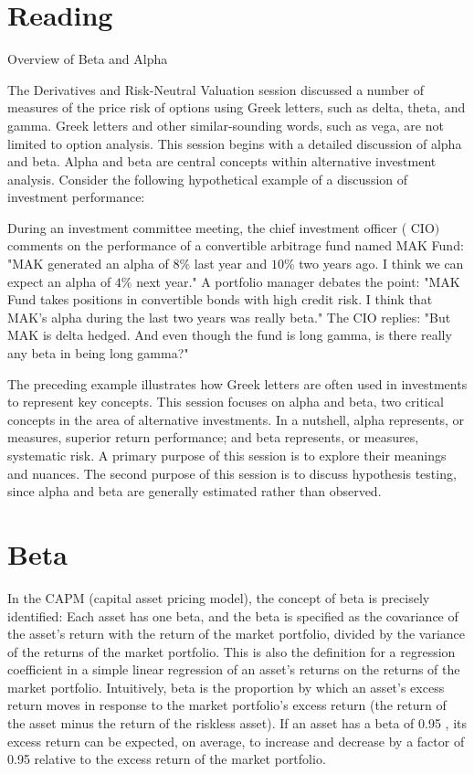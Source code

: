 \documentclass[11pt]{article}
\begin{document}
\section*{Reading}
Overview of Beta and Alpha

The Derivatives and Risk-Neutral Valuation session discussed a number of measures of the price risk of options using Greek letters, such as delta, theta, and gamma. Greek letters and other similar-sounding words, such as vega, are not limited to option analysis. This session begins with a detailed discussion of alpha and beta. Alpha and beta are central concepts within alternative investment analysis. Consider the following hypothetical example of a discussion of investment performance:

During an investment committee meeting, the chief investment officer ( $\mathrm{CIO})$ comments on the performance of a convertible arbitrage fund named MAK Fund: "MAK generated an alpha of $8 \%$ last year and $10 \%$ two years ago. I think we can expect an alpha of $4 \%$ next year." A portfolio manager debates the point: "MAK Fund takes positions in convertible bonds with high credit risk. I think that MAK's alpha during the last two years was really beta." The CIO replies: "But MAK is delta hedged. And even though the fund is long gamma, is there really any beta in being long gamma?"

The preceding example illustrates how Greek letters are often used in investments to represent key concepts. This session focuses on alpha and beta, two critical concepts in the area of alternative investments. In a nutshell, alpha represents, or measures, superior return performance; and beta represents, or measures, systematic risk. A primary purpose of this session is to explore their meanings and nuances. The second purpose of this session is to discuss hypothesis testing, since alpha and beta are generally estimated rather than observed.

\section*{Beta}
In the CAPM (capital asset pricing model), the concept of beta is precisely identified: Each asset has one beta, and the beta is specified as the covariance of the asset's return with the return of the market portfolio, divided by the variance of the returns of the market portfolio. This is also the definition for a regression coefficient in a simple linear regression of an asset's returns on the returns of the market portfolio. Intuitively, beta is the proportion by which an asset's excess return moves in response to the market portfolio's excess return (the return of the asset minus the return of the riskless asset). If an asset has a beta of 0.95 , its excess return can be expected, on average, to increase and decrease by a factor of 0.95 relative to the excess return of the market portfolio.
\end{document}
